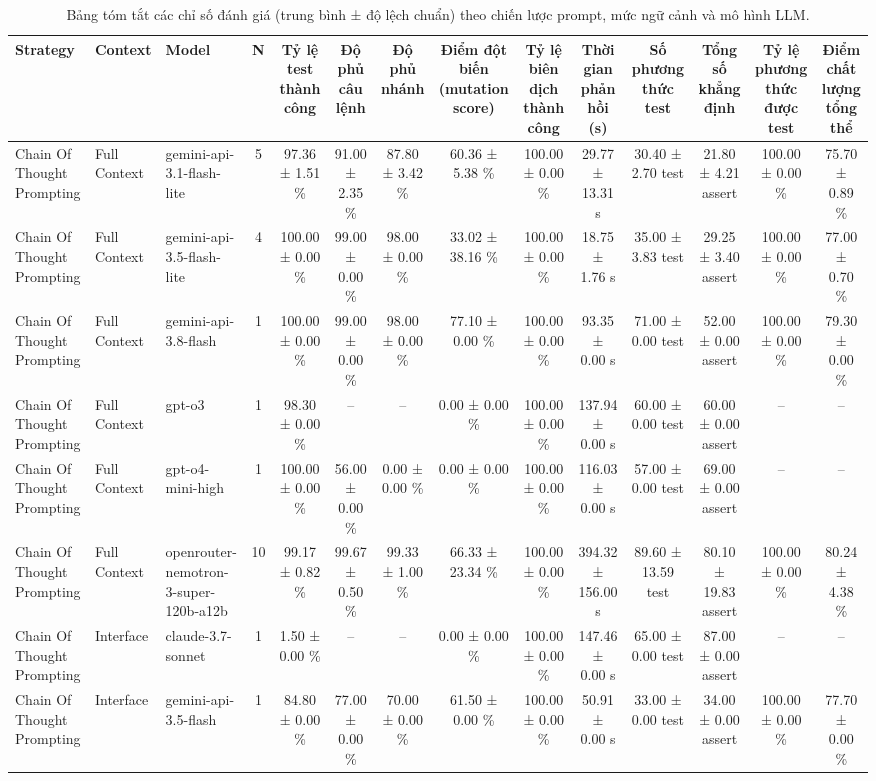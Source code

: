 \begin{table}[htbp]
\centering
\small
\caption{Bảng tóm tắt các chỉ số đánh giá (trung bình ± độ lệch chuẩn) theo chiến lược prompt, mức ngữ cảnh và mô hình LLM.}\label{tab:summary}
\begin{tabular}{lllccccccccccc}
\toprule
Strategy & Context & Model & N & Tỷ lệ test thành công & Độ phủ câu lệnh & Độ phủ nhánh & Điểm đột biến (mutation score) & Tỷ lệ biên dịch thành công & Thời gian phản hồi (s) & Số phương thức test & Tổng số khẳng định & Tỷ lệ phương thức được test & Điểm chất lượng tổng thể \\
\midrule
Chain Of Thought Prompting & Full Context & gemini-api-3.1-flash-lite & 5 & 97.36 ± 1.51 \% & 91.00 ± 2.35 \% & 87.80 ± 3.42 \% & 60.36 ± 5.38 \% & 100.00 ± 0.00 \% & 29.77 ± 13.31 s & 30.40 ± 2.70 test & 21.80 ± 4.21 assert & 100.00 ± 0.00 \% & 75.70 ± 0.89 \% \\
Chain Of Thought Prompting & Full Context & gemini-api-3.5-flash-lite & 4 & 100.00 ± 0.00 \% & 99.00 ± 0.00 \% & 98.00 ± 0.00 \% & 33.02 ± 38.16 \% & 100.00 ± 0.00 \% & 18.75 ± 1.76 s & 35.00 ± 3.83 test & 29.25 ± 3.40 assert & 100.00 ± 0.00 \% & 77.00 ± 0.70 \% \\
Chain Of Thought Prompting & Full Context & gemini-api-3.8-flash & 1 & 100.00 ± 0.00 \% & 99.00 ± 0.00 \% & 98.00 ± 0.00 \% & 77.10 ± 0.00 \% & 100.00 ± 0.00 \% & 93.35 ± 0.00 s & 71.00 ± 0.00 test & 52.00 ± 0.00 assert & 100.00 ± 0.00 \% & 79.30 ± 0.00 \% \\
Chain Of Thought Prompting & Full Context & gpt-o3 & 1 & 98.30 ± 0.00 \% & – & – & 0.00 ± 0.00 \% & 100.00 ± 0.00 \% & 137.94 ± 0.00 s & 60.00 ± 0.00 test & 60.00 ± 0.00 assert & – & – \\
Chain Of Thought Prompting & Full Context & gpt-o4-mini-high & 1 & 100.00 ± 0.00 \% & 56.00 ± 0.00 \% & 0.00 ± 0.00 \% & 0.00 ± 0.00 \% & 100.00 ± 0.00 \% & 116.03 ± 0.00 s & 57.00 ± 0.00 test & 69.00 ± 0.00 assert & – & – \\
Chain Of Thought Prompting & Full Context & openrouter-nemotron-3-super-120b-a12b & 10 & 99.17 ± 0.82 \% & 99.67 ± 0.50 \% & 99.33 ± 1.00 \% & 66.33 ± 23.34 \% & 100.00 ± 0.00 \% & 394.32 ± 156.00 s & 89.60 ± 13.59 test & 80.10 ± 19.83 assert & 100.00 ± 0.00 \% & 80.24 ± 4.38 \% \\
Chain Of Thought Prompting & Interface & claude-3.7-sonnet & 1 & 1.50 ± 0.00 \% & – & – & 0.00 ± 0.00 \% & 100.00 ± 0.00 \% & 147.46 ± 0.00 s & 65.00 ± 0.00 test & 87.00 ± 0.00 assert & – & – \\
Chain Of Thought Prompting & Interface & gemini-api-3.5-flash & 1 & 84.80 ± 0.00 \% & 77.00 ± 0.00 \% & 70.00 ± 0.00 \% & 61.50 ± 0.00 \% & 100.00 ± 0.00 \% & 50.91 ± 0.00 s & 33.00 ± 0.00 test & 34.00 ± 0.00 assert & 100.00 ± 0.00 \% & 77.70 ± 0.00 \% \\

\end{tabular}
\end{table}
